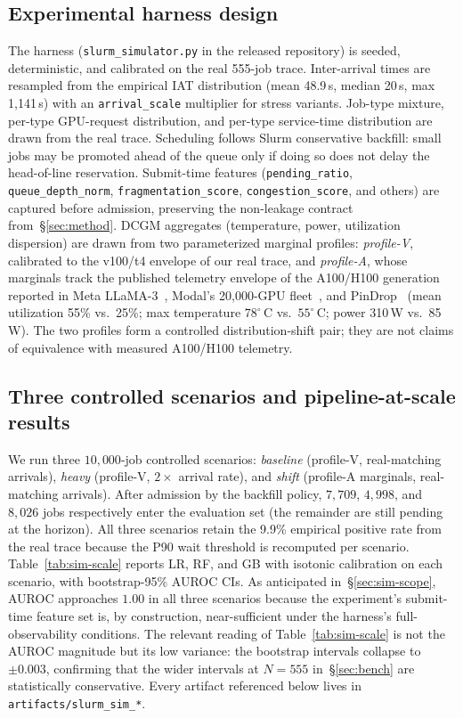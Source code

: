 \documentclass[conference]{IEEEtran}
\begin{document}
\subsection{Experimental harness design}
The harness (\texttt{slurm\_simulator.py} in the released repository) is seeded, deterministic, and calibrated on the real 555-job trace. Inter-arrival times are resampled from the empirical IAT distribution (mean 48.9\,s, median 20\,s, max 1{,}141\,s) with an \texttt{arrival\_scale} multiplier for stress variants. Job-type mixture, per-type GPU-request distribution, and per-type service-time distribution are drawn from the real trace. Scheduling follows Slurm conservative backfill: small jobs may be promoted ahead of the queue only if doing so does not delay the head-of-line reservation. Submit-time features (\texttt{pending\_ratio}, \texttt{queue\_depth\_norm}, \texttt{fragmentation\_score}, \texttt{congestion\_score}, and others) are captured before admission, preserving the non-leakage contract from~\S\ref{sec:method}. DCGM aggregates (temperature, power, utilization dispersion) are drawn from two parameterized marginal profiles: \emph{profile-V}, calibrated to the v100/t4 envelope of our real trace, and \emph{profile-A}, whose marginals track the published telemetry envelope of the A100/H100 generation reported in Meta LLaMA-3~\cite{llama3}, Modal's 20{,}000-GPU fleet~\cite{modal2025}, and PinDrop~\cite{pindrop2026} (mean utilization 55\% vs.\ 25\%; max temperature $78^{\circ}$\,C vs.\ $55^{\circ}$\,C; power 310\,W vs.\ 85\,W). The two profiles form a controlled distribution-shift pair; they are not claims of equivalence with measured A100/H100 telemetry.

\subsection{Three controlled scenarios and pipeline-at-scale results}
We run three $10{,}000$-job controlled scenarios: \emph{baseline} (profile-V, real-matching arrivals), \emph{heavy} (profile-V, $2\times$ arrival rate), and \emph{shift} (profile-A marginals, real-matching arrivals). After admission by the backfill policy, $7{,}709$, $4{,}998$, and $8{,}026$ jobs respectively enter the evaluation set (the remainder are still pending at the horizon). All three scenarios retain the 9.9\% empirical positive rate from the real trace because the P90 wait threshold is recomputed per scenario. Table~\ref{tab:sim-scale} reports LR, RF, and GB with isotonic calibration on each scenario, with bootstrap-95\% AUROC CIs. As anticipated in~\S\ref{sec:sim-scope}, AUROC approaches $1.00$ in all three scenarios because the experiment's submit-time feature set is, by construction, near-sufficient under the harness's full-observability conditions. The relevant reading of Table~\ref{tab:sim-scale} is not the AUROC magnitude but its low variance: the bootstrap intervals collapse to $\pm 0.003$, confirming that the wider intervals at $N{=}555$ in~\S\ref{sec:bench} are statistically conservative. Every artifact referenced below lives in \texttt{artifacts/slurm\_sim\_*}.
\end{document}
